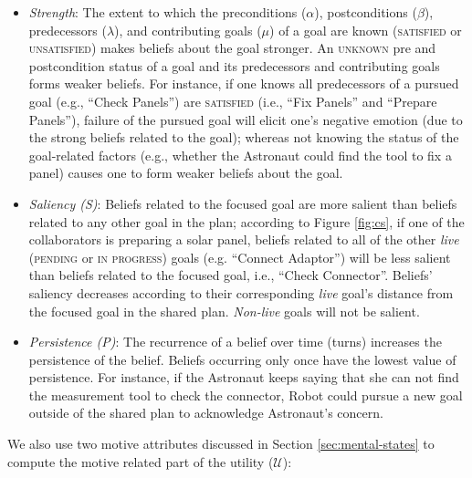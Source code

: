 \documentclass[12pt]{report}
\begin{document}
\begin{itemize}
  \setlength\itemsep{1mm}
  \item \textit{Strength}: The extent to which the preconditions ($\alpha$),
  postconditions ($\beta$), predecessors ($\lambda$), and contributing goals
  ($\mu$) of a goal are known (\textsc{satisfied} or \textsc{unsatisfied}) makes
  beliefs about the goal stronger. An \textsc{unknown} pre and postcondition
  status of a goal and its predecessors and contributing goals forms weaker
  beliefs. For instance, if one knows all predecessors of a pursued goal (e.g.,
  ``Check Panels'') are \textsc{satisfied} (i.e., ``Fix Panels'' and ``Prepare
  Panels''), failure of the pursued goal will elicit one's negative emotion (due
  to the strong beliefs related to the goal); whereas not knowing the status of
  the goal-related factors (e.g., whether the Astronaut could find the tool to
  fix a panel) causes one to form weaker beliefs about the goal.
  \item \textit{Saliency (S)}: Beliefs related to the focused goal are more
  salient than beliefs related to any other goal in the plan; according to
  Figure \ref{fig:cs}, if one of the collaborators is preparing a solar panel,
  beliefs related to all of the other \textit{live} (\textsc{pending} or
  \textsc{in progress}) goals (e.g. ``Connect Adaptor'') will be less salient
  than beliefs related to the focused goal, i.e., ``Check Connector''. Beliefs'
  saliency decreases according to their corresponding \textit{live} goal's
  distance from the focused goal in the shared plan. \textit{Non-live} goals
  will not be salient.
  \item \textit{Persistence (P)}: The recurrence of a belief over time (turns)
  increases the persistence of the belief. Beliefs occurring only once have the
  lowest value of persistence. For instance, if the Astronaut keeps saying that
  she can not find the measurement tool to check the connector, Robot could  
  pursue a new goal outside of the shared plan to acknowledge Astronaut's
  concern.
\end{itemize}

\noindent We also use two motive attributes discussed in Section
\ref{sec:mental-states} to compute the motive related part of the utility
($\mathcal{U}$):
\end{document}
